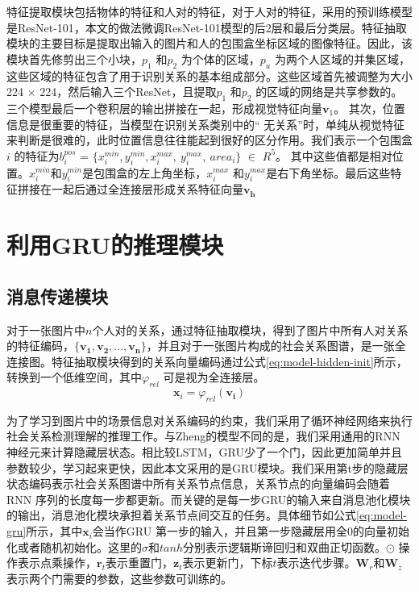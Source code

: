 特征提取模块包括物体的特征和人对的特征，对于人对的特征，采用的预训练模型是ResNet-101\cite{he2016deep}，本文的做法微调ResNet-101模型的后2层和最后分类层。特征抽取模块的主要目标是提取出输入的图片和人的包围盒坐标区域的图像特征。因此，该模块首先修剪出三个小块，$p_1$ 和$p_2$ 为个体的区域，$p_{u}$ 为两个人区域的并集区域，这些区域的特征包含了用于识别关系的基本组成部分。这些区域首先被调整为大小224 $\times$ 224，然后输入三个ResNet，且提取$p_1$ 和$p_2$ 的区域的网络是共享参数的。三个模型最后一个卷积层的输出拼接在一起，形成视觉特征向量$\mathbf{v}_1$。 其次，位置信息是很重要的特征，当模型在识别关系类别中的`` 无关系''时，单纯从视觉特征来判断是很难的，此时位置信息往往能起到很好的区分作用。我们表示一个包围盒$i$ 的特征为$b_i^{pos}$ = $\{ x_{i}^{min}, y_{i}^{min}, x_{i}^{max}, ~y_{i}^{max},~ area_{i} \}$ $\in$ $R^5$。 其中这些值都是相对位置。$x_{i}^{min}$和$y_{i}^{min}$是包围盒的左上角坐标，$x_{i}^{max}$ 和$y_{i}^{max}$是右下角坐标。最后这些特征拼接在一起后通过全连接层形成关系特征向量$\mathbf{v_h}$


\section{利用GRU的推理模块}

\subsection{消息传递模块}
对于一张图片中$n$个人对的关系，通过特征抽取模块，得到了图片中所有人对关系的特征编码，$\{ \mathbf{v_{1}},\mathbf{v_{2}},...,\mathbf{v_{n}} \}$，并且对于一张图片构成的社会关系图谱，是一张全连接图。特征抽取模块得到的关系向量编码通过公式\ref{eq:model-hidden-init}所示，转换到一个低维空间，其中$ \varphi_{rel} $ 可是视为全连接层。
\begin{equation} \label{eq:model-hidden-init}
    \mathbf{x}_{i} = \varphi_{rel} (\mathbf{v_{i}})
\end{equation}

为了学习到图片中的场景信息对关系编码的约束，我们采用了循环神经网络来执行社会关系检测理解的推理工作。与Zheng\cite{zheng2015conditional}的模型不同的是，我们采用通用的RNN 神经元来计算隐藏层状态。相比较LSTM，GRU少了一个门，因此更加简单并且参数较少，学习起来更快，因此本文采用的是GRU模块。我们采用第t步的隐藏层状态编码表示社会关系图谱中所有关系节点信息，关系节点的向量编码会随着RNN 序列的长度每一步都更新。而关键的是每一步GRU的输入来自消息池化模块的输出，消息池化模块承担着关系节点间交互的任务。具体细节如公式\ref{eq:model-gru}所示，其中$\mathbf{x}_i$会当作GRU 第一步的输入，并且第一步隐藏层用全0的向量初始化或者随机初始化。这里的$\sigma$和$tanh$分别表示逻辑斯谛回归和双曲正切函数。$\odot$ 操作表示点乘操作，$\bm{r}_t$表示重置门，$\bm{z}_t$表示更新门，下标$t$表示迭代步骤。$\mathbf{W}_r$和$\mathbf{W}_z$ 表示两个门需要的参数，这些参数可训练的。

